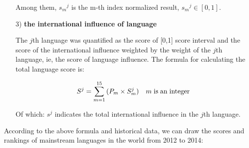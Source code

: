 \begin{enumerate}
	\par Among them, ${s_m}^j$ is the m-th index normalized result, ${s_m}^j \in [0,1]$.
	
	\item[3)] \textbf{the international influence of language}
	\par The $j$th language was quantified as the score of [0,1] score interval and the score  of the international influence weighted by the weight of the $j$th language, ie, the score of language influence. The formula for calculating the total language score is:
	 
	 \begin{equation}
	 {S^j} = \sum\limits_{m = 1}^{15} {({P_m} \times S_m^j)} {\rm{       }}\quad m\;{\rm{ is\; an\; integer}} \label{aa1}
	 \end{equation}
	 \par Of which: ${s^j}$ indicates the total international influence in the $j$th language.
	
\end{enumerate}

\par According to the above formula and historical data, we can draw the scores and rankings of mainstream languages in the world from 2012 to 2014:


